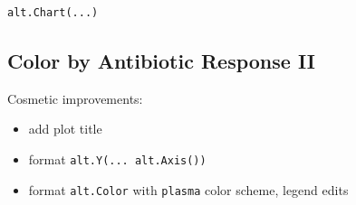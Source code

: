 \documentclass[
  letterpaper,
  DIV=11,
  numbers=noendperiod]{scrartcl}
\providecommand{\tightlist}{%
  \setlength{\itemsep}{0pt}\setlength{\parskip}{0pt}}\usepackage{longtable,booktabs,array}
\begin{document}
\begin{verbatim}
alt.Chart(...)
\end{verbatim}

\subsection{Color by Antibiotic Response
II}\label{color-by-antibiotic-response-ii}

Cosmetic improvements:

\begin{itemize}
\tightlist
\item
  add plot title
\item
  format \texttt{alt.Y(...\ alt.Axis())}
\item
  format \texttt{alt.Color} with \texttt{plasma} color scheme, legend
  edits
\end{itemize}
\end{document}
